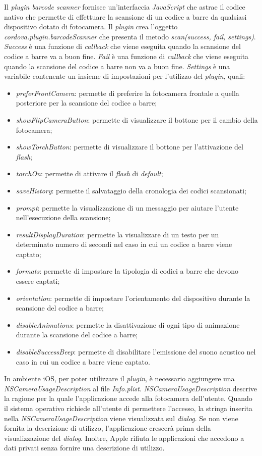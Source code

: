 Il \textit{plugin} \textit{barcode scanner} fornisce un'interfaccia \textit{JavaScript} che astrae il codice nativo che permette di effettuare la scansione di un codice a barre da qualsiasi dispositivo dotato di fotocamera. Il \textit{plugin} crea l'oggetto \textit{cordova.plugin.barcodeScanner} che presenta il metodo \textit{scan(success, fail, settings)}. \textit{Success} è una funzione di \textit{callback} che viene eseguita quando la scansione del codice a barre va a buon fine. \textit{Fail} è una funzione di \textit{callback} che viene eseguita quando la scansione del codice a barre non va a buon fine. \textit{Settings} è una variabile contenente un insieme di impostazioni per l'utilizzo del \textit{plugin}, quali:
\begin{itemize}
	\item \textit{preferFrontCamera}: permette di preferire la fotocamera frontale a quella posteriore per la scansione del codice a barre;
	\item \textit{showFlipCameraButton}: permette di visualizzare il bottone per il cambio della fotocamera;
	\item \textit{showTorchButton}: permette di visualizzare il bottone per l'attivazione del \textit{flash};
	\item \textit{torchOn}: permette di attivare il \textit{flash} di \textit{default};
	\item \textit{saveHistory}: permette il salvataggio della cronologia dei codici scansionati;
	\item \textit{prompt}: permette la visualizzazione di un messaggio per aiutare l'utente nell'esecuzione della scansione;
	\item \textit{resultDisplayDuration}: permette la visualizzare di un testo per un determinato numero di secondi nel caso in cui un codice a barre viene captato;
	\item \textit{formats}: permette di impostare la tipologia di codici a barre che devono essere captati;
	\item \textit{orientation}: permette di impostare l'orientamento del dispositivo durante la scansione del codice a barre;
	\item \textit{disableAnimations}: permette la disattivazione di ogni tipo di animazione durante la scansione del codice a barre;
	\item \textit{disableSuccessBeep}: permette di disabilitare l'emissione del suono acustico nel caso in cui un codice a barre viene captato.
\end{itemize}
In ambiente iOS, per poter utilizzare il \textit{plugin}, è necessario aggiungere una \textit{NSCameraUsageDescription} al file \textit{Info.plist}. \textit{NSCameraUsageDescription} descrive la ragione per la quale l'applicazione accede alla fotocamera dell'utente. Quando il sistema operativo richiede all'utente di permettere l'accesso, la stringa inserita nella \textit{NSCameraUsageDescription} viene visualizzata sul \textit{dialog}. Se non viene fornita la descrizione di utilizzo, l'applicazione crescerà prima della visualizzazione del \textit{dialog}. Inoltre, Apple rifiuta le applicazioni che accedono a dati privati senza fornire una descrizione di utilizzo. 

